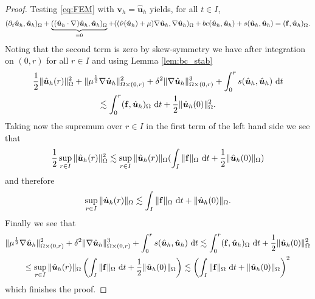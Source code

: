 \documentclass[10pt]{amsart}
\numberwithin{equation}{section}
\theoremstyle{definition}
\theoremstyle{remark}
\renewcommand{\(}{\bigl(}
\renewcommand{\)}{\bigr)}
\newcommand{\bld}[1]{\boldsymbol{#1}}
\newcommand{\bv}{\bld{v}}
\newcommand{\bhu}{\hat{\bld{u}}}
\begin{document}
\begin{proof}
Testing \eqref{eq:FEM} with $\bv_h = \bhu_h$ yields, for all $t \in I$,
\begin{equation}\label{eq:stab1}
(\partial_t \bhu_h, \bhu_h)_\Omega + \underbrace{((\bhu_h \cdot
  \nabla) \bhu_h, \bhu_h)_\Omega}_{=0} + ((\hat \nu(\bhu_h)  + \mu) \nabla \bhu_h,\nabla
\bhu_h)_\Omega + bc(\bhu_h,\bhu_h) + s(\bhu_h,\bhu_h)
= ({\bf f}, \bhu_h)_\Omega.
\end{equation}
Noting that the second term is zero by skew-symmetry we have after
integration on $(0,r)$ for all $r \in I$ and using Lemma \ref{lem:bc_stab}
\begin{multline}\label{eq:stab2}
\frac12 \|\bhu_h(r) \|_\Omega^2+\|\mu^{\frac12} \nabla
\bhu_h\|_{\Omega \times (0,r)}^2+\delta^2 \|\nabla
\bhu_h\|^{3}_{\Omega \times (0,r)} + \int_0^r s(\bhu_h,\bhu_h) ~\mbox{d}t
\\
\lesssim\int_0^r ({\bf f}, \bhu_h)_\Omega ~\mbox{d}t + \frac12 \|\bhu_h(0) \|_\Omega^2.
\end{multline}
Taking now the supremum over $r \in I$ in the first term of the left
hand side we see that
\[
\frac12\sup_{r \in I}  \|\bhu_h(r) \|_\Omega^2 \lesssim \sup_{r \in I}
\|\bhu_h(r) \|_\Omega (\int_I \|{\bf f }\|_\Omega ~\mbox{d}t + \frac12 \|\bhu_h(0) \|_\Omega)
\]
and therefore
\[
\sup_{r \in I}  \|\bhu_h(r) \|_\Omega \lesssim \int_I \|{\bf f} \|_\Omega ~\mbox{d}t+\|\bhu_h(0) \|_\Omega.
\]
Finally we see that
\begin{multline*}
\|\mu^{\frac12} \nabla
\bhu_h\|_{\Omega \times (0,r)}^2+ \delta^2\|\nabla
\bhu_h\|^{3}_{\Omega \times (0,r)}+\int_0^r s(\bhu_h,\bhu_h) ~\mbox{d}t 
\lesssim  \int_0^r ({\bf f}, \bhu_h)_\Omega ~\mbox{d}t + \frac12 \|\bhu_h(0) \|_\Omega^2 \\\leq \sup_{r \in I}
\|\bhu_h(r) \|_\Omega \left(\int_I \|{\bf f }\|_\Omega ~\mbox{d}t + \frac12
\|\bhu_h(0) \|_\Omega\right)
\lesssim \left(\int_I \|{\bf f }\|_\Omega ~\mbox{d}t + \|\bhu_h(0) \|_\Omega\right)^2
\end{multline*}
which finishes the proof.
\end{proof}
\end{document}
